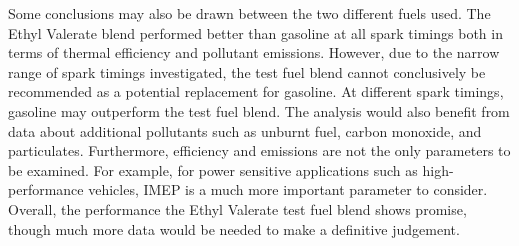 \documentclass[11pt]{article}
\begin{document}
Some conclusions may also be drawn between the two different fuels used. The Ethyl Valerate blend performed better than gasoline at all spark timings both in terms of thermal efficiency and pollutant emissions. However, due to the narrow range of spark timings investigated, the test fuel blend cannot conclusively be recommended as a potential replacement for gasoline. At different spark timings, gasoline may outperform the test fuel blend. The analysis would also benefit from data about additional pollutants such as unburnt fuel, carbon monoxide, and particulates. Furthermore, efficiency and emissions are not the only parameters to be examined. For example, for power sensitive applications such as high-performance vehicles, IMEP is a much more important parameter to consider. Overall, the performance the Ethyl Valerate test fuel blend shows promise, though much more data would be needed to make a definitive judgement. 
\end{document}
